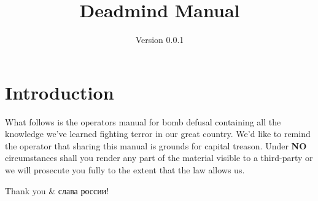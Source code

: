 \documentclass{article}
\title{Deadmind Manual}
\date{Version 0.0.1}
\begin{document}
\BgThispage

\maketitle

\section* {Introduction}
What follows is the operators manual for bomb defusal containing all the knowledge we've learned fighting terror in our great country. We'd like to remind the operator that sharing this manual is grounds for capital treason. Under \textbf{NO} circumstances shall you render any part of the material visible to a third-party or we will prosecute you fully to the extent that the law allows us.

Thank you \& слава россии!
\end{document}
